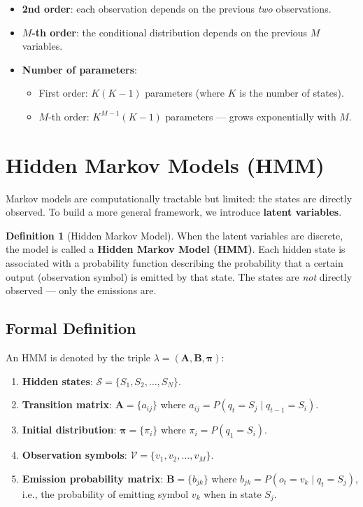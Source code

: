 \documentclass[11pt,a4paper]{article}
\theoremstyle{definition}
\newtheorem{definition}{Definition}[section]
\theoremstyle{plain}
\theoremstyle{remark}
\begin{document}
\begin{itemize}
    \item \textbf{2nd order}: each observation depends on the previous \emph{two} observations.
    \item \textbf{$M$-th order}: the conditional distribution depends on the previous $M$ variables.
    \item \textbf{Number of parameters}:
    \begin{itemize}
        \item First order: $K(K-1)$ parameters (where $K$ is the number of states).
        \item $M$-th order: $K^{M-1}(K-1)$ parameters --- grows exponentially with $M$.
    \end{itemize}
\end{itemize}

\section{Hidden Markov Models (HMM)}

Markov models are computationally tractable but limited: the states are directly observed. To build a more general framework, we introduce \textbf{latent variables}.

\begin{definition}[Hidden Markov Model]
When the latent variables are discrete, the model is called a \textbf{Hidden Markov Model (HMM)}. Each hidden state is associated with a probability function describing the probability that a certain output (observation symbol) is emitted by that state. The states are \emph{not} directly observed --- only the emissions are.
\end{definition}

\subsection{Formal Definition}

An HMM is denoted by the triple $\lambda = (\mathbf{A}, \mathbf{B}, \boldsymbol{\pi})$:

\begin{tcolorbox}[colback=green!5!white,colframe=green!75!black,title=\textbf{HMM Components}]
\begin{enumerate}
    \item \textbf{Hidden states}: $\mathcal{S} = \{S_1, S_2, \dots, S_N\}$.
    \item \textbf{Transition matrix}: $\mathbf{A} = \{a_{ij}\}$ where $a_{ij} = P(q_t = S_j \mid q_{t-1} = S_i)$.
    \item \textbf{Initial distribution}: $\boldsymbol{\pi} = \{\pi_i\}$ where $\pi_i = P(q_1 = S_i)$.
    \item \textbf{Observation symbols}: $\mathcal{V} = \{v_1, v_2, \dots, v_M\}$.
    \item \textbf{Emission probability matrix}: $\mathbf{B} = \{b_{jk}\}$ where $b_{jk} = P(o_t = v_k \mid q_t = S_j)$, i.e., the probability of emitting symbol $v_k$ when in state $S_j$.
\end{enumerate}
\end{tcolorbox}
\end{document}
